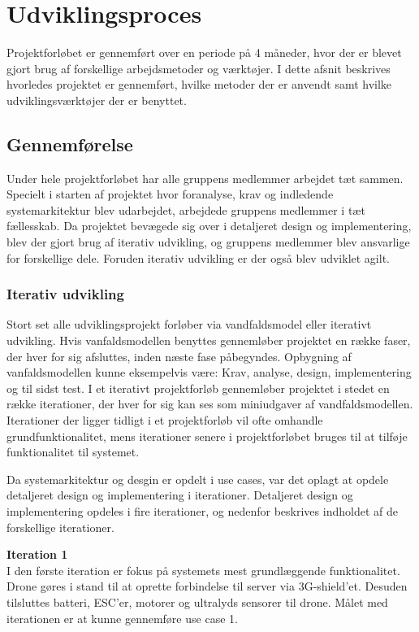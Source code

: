 \section{Udviklingsproces}
Projektforløbet er gennemført over en periode på 4 måneder, hvor der er blevet gjort brug af forskellige arbejdsmetoder og værktøjer. I dette afsnit beskrives hvorledes projektet er gennemført, hvilke metoder der er anvendt samt hvilke udviklingsværktøjer der er benyttet.

\subsection{Gennemførelse}
Under hele projektforløbet har alle gruppens medlemmer arbejdet tæt sammen. Specielt i starten af projektet hvor foranalyse, krav og indledende systemarkitektur blev udarbejdet, arbejdede gruppens medlemmer i tæt fællesskab. 
Da projektet bevægede sig over i detaljeret design og implementering, blev der gjort brug af iterativ udvikling, og gruppens medlemmer blev ansvarlige for forskellige dele. Foruden iterativ udvikling er der også blev udviklet agilt.


\subsubsection{Iterativ udvikling}
Stort set alle udviklingsprojekt forløber via vandfaldsmodel eller iterativt udvikling. 
Hvis vanfaldsmodellen benyttes gennemløber projektet en række faser, der hver for sig afsluttes, inden næste fase påbegyndes. Opbygning af vanfaldsmodellen kunne eksempelvis være: Krav, analyse, design, implementering og til sidst test.
I et iterativt projektforløb gennemløber projektet i stedet en række iterationer, der hver for sig kan ses som miniudgaver af vandfaldsmodellen. Iterationer der ligger tidligt i et projektforløb vil ofte omhandle grundfunktionalitet, mens iterationer senere i projektforløbet bruges til at tilføje funktionalitet til systemet. 

\newpage 

Da systemarkitektur og desgin er opdelt i use cases, var det oplagt at opdele detaljeret design og implementering  i iterationer. Detaljeret design og implementering opdeles i fire iterationer, og nedenfor beskrives indholdet af de forskellige iterationer.  

\textbf{Iteration 1}\\
I den første iteration er fokus på systemets mest grundlæggende funktionalitet. 
Drone gøres i stand til at oprette forbindelse til server via 3G-shield'et.
Desuden tilsluttes batteri, ESC'er, motorer og ultralyds sensorer til drone. 
Målet med iterationen er at kunne gennemføre use case 1. 

